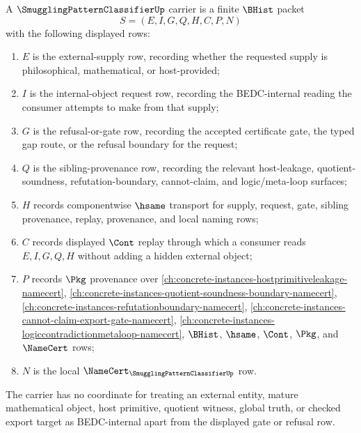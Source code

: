 \begin{definition}
\label{def:smuggling-pattern-classifier-carrier}
A $\SmugglingPatternClassifierUp$ carrier is a finite $\BHist$ packet
$$
S=(E,I,G,Q,H,C,P,N)
$$
with the following displayed rows:
\begin{enumerate}
\item $E$ is the external-supply row, recording whether the requested supply is philosophical, mathematical, or host-provided;
\item $I$ is the internal-object request row, recording the BEDC-internal reading the consumer attempts to make from that supply;
\item $G$ is the refusal-or-gate row, recording the accepted certificate gate, the typed gap route, or the refusal boundary for the request;
\item $Q$ is the sibling-provenance row, recording the relevant host-leakage, quotient-soundness, refutation-boundary, cannot-claim, and logic/meta-loop surfaces;
\item $H$ records componentwise $\hsame$ transport for supply, request, gate, sibling provenance, replay, provenance, and local naming rows;
\item $C$ records displayed $\Cont$ replay through which a consumer reads $E,I,G,Q,H$ without adding a hidden external object;
\item $P$ records $\Pkg$ provenance over \autoref{ch:concrete-instances-hostprimitiveleakage-namecert}, \autoref{ch:concrete-instances-quotient-soundness-boundary-namecert}, \autoref{ch:concrete-instances-refutationboundary-namecert}, \autoref{ch:concrete-instances-cannot-claim-export-gate-namecert}, \autoref{ch:concrete-instances-logiccontradictionmetaloop-namecert}, $\BHist$, $\hsame$, $\Cont$, $\Pkg$, and $\NameCert$ rows;
\item $N$ is the local $\NameCert_{\SmugglingPatternClassifierUp}$ row.
\end{enumerate}
The carrier has no coordinate for treating an external entity, mature mathematical object, host primitive, quotient witness, global truth, or checked export target as BEDC-internal apart from the displayed gate or refusal row.
\end{definition}

